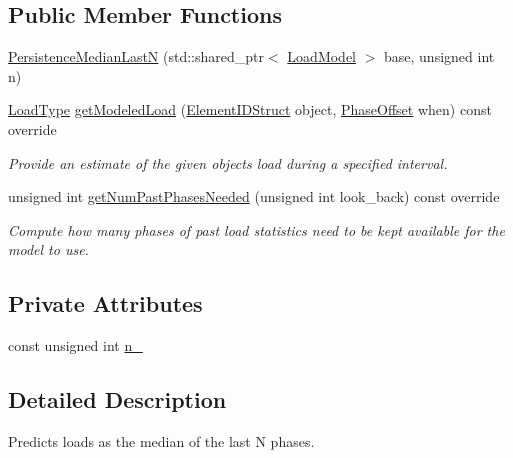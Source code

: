 \subsection*{Public Member Functions}
\begin{DoxyCompactItemize}
\item 
\hyperlink{structvt_1_1vrt_1_1collection_1_1balance_1_1_persistence_median_last_n_afeb915b217785638e82918d6f2b23d8b}{Persistence\+Median\+LastN} (std\+::shared\+\_\+ptr$<$ \hyperlink{structvt_1_1vrt_1_1collection_1_1balance_1_1_load_model}{Load\+Model} $>$ base, unsigned int n)
\item 
\hyperlink{namespacevt_a8fb51741340b87d7aaee0bef60e9896b}{Load\+Type} \hyperlink{structvt_1_1vrt_1_1collection_1_1balance_1_1_persistence_median_last_n_a766f233762ecd5013c575f33bf38680c}{get\+Modeled\+Load} (\hyperlink{namespacevt_1_1vrt_1_1collection_1_1balance_a9f5b53fafb270212279a4757d2c4cd28}{Element\+I\+D\+Struct} object, \hyperlink{structvt_1_1vrt_1_1collection_1_1balance_1_1_phase_offset}{Phase\+Offset} when) const override
\begin{DoxyCompactList}\small\item\em Provide an estimate of the given object\textquotesingle{}s load during a specified interval. \end{DoxyCompactList}\item 
unsigned int \hyperlink{structvt_1_1vrt_1_1collection_1_1balance_1_1_persistence_median_last_n_a4f65801b9a93bfbc24e98b8ff1e111bc}{get\+Num\+Past\+Phases\+Needed} (unsigned int look\+\_\+back) const override
\begin{DoxyCompactList}\small\item\em Compute how many phases of past load statistics need to be kept available for the model to use. \end{DoxyCompactList}\end{DoxyCompactItemize}
\subsection*{Private Attributes}
\begin{DoxyCompactItemize}
\item 
const unsigned int \hyperlink{structvt_1_1vrt_1_1collection_1_1balance_1_1_persistence_median_last_n_aa800c86e610ba7b4ff0ddf0c91210136}{n\+\_\+}
\end{DoxyCompactItemize}


\subsection{Detailed Description}
Predicts loads as the median of the last N phases. 

